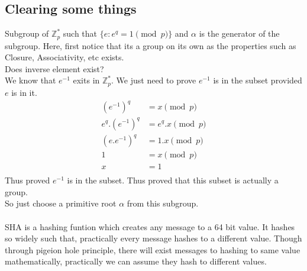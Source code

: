 \documentclass[english, 11pt]{article}
\begin{document}
\subsection*{Clearing some things}
Subgroup of $\mathbb{Z}^*_p$ such that $\{ e : e^q = 1 \pmod{p} \} $ and $\alpha$ is the generator of the subgroup. Here, first notice that its a group on its own as the properties such as Closure, Associativity, etc exists.\\
Does inverse element exist?\\
We know that $e^{-1}$ exits in $\mathbb{Z}^*_p$. We just need to prove $e^{-1}$ is in the subset provided $e$ is in it.
\begin{align*}
  (e^{-1})^q &= x \pmod{p} \\
  e^q . (e^{-1})^q &= e^q . x \pmod{p} \\
  (e . e^{-1})^q &= 1 . x \pmod{p} \\
  1 &= x \pmod{p} \\
  x &= 1\\
\end{align*}
Thus proved $e^{-1}$ is in the subset. Thus proved that this subset is actually a group. \\
So just choose a primitive root $\alpha$ from this subgroup. \\ \\
SHA is a hashing funtion which creates any message to a 64 bit value. It hashes so widely such that, practically every message hashes to a different value. Though through pigeion hole principle, there will exist messages to hashing to same value mathematically, practically we can assume they hash to different values.
\end{document}
